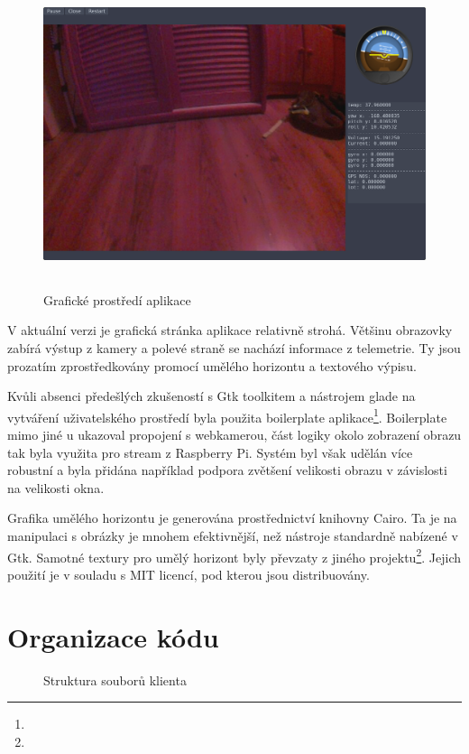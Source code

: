\documentclass[a4paper,oneside,12pt]{report}
\begin{document}
\begin{figure}[h]
  \centering
  \includegraphics[height=9cm]{../img/interface.png}
  \caption[Grafické prostředí aplikace]{Grafické prostředí aplikace}
\end{figure}

V aktuální verzi je grafická stránka aplikace relativně strohá.
Většinu obrazovky zabírá výstup z kamery a polevé straně se nachází informace z telemetrie.
Ty jsou prozatím zprostředkovány promocí umělého horizontu a textového výpisu.

Kvůli absenci předešlých zkušeností s Gtk toolkitem a nástrojem glade na vytváření uživatelského prostředí byla použita boilerplate aplikace\footnote{}.
Boilerplate mimo jiné u ukazoval propojení s webkamerou, část logiky okolo zobrazení obrazu tak byla využita pro stream z Raspberry Pi.
Systém byl však udělán více robustní a byla přidána například podpora zvětšení velikosti obrazu v závislosti na velikosti okna.

Grafika umělého horizontu je generována prostřednictví knihovny Cairo.
Ta je na manipulaci s obrázky je mnohem efektivnější, než nástroje standardně nabízené v Gtk.
Samotné textury pro umělý horizont byly převzaty z jiného projektu\footnote{}.
Jejich použití je v souladu s MIT licencí, pod kterou jsou distribuovány.

\section{Organizace kódu}

\begin{figure}[h]
  \caption[Struktura souborů klienta]{Struktura souborů klienta}
\end{figure}
\end{document}
